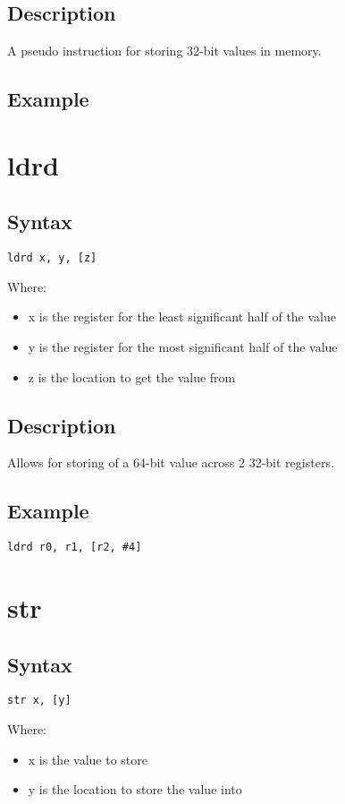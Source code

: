 \documentclass[11pt]{scrartcl}
\begin{document}
\subsection{Description}
A pseudo instruction for storing 32-bit values in memory.
\subsection{Example}

\section{ldrd}
\subsection{Syntax}
\begin{verbatim}
ldrd x, y, [z]
\end{verbatim}
Where:
\begin{itemize}
    \item x is the register for the least significant half of the value
    \item y is the register for the most significant half of the value
    \item z is the location to get the value from
\end{itemize}
\subsection{Description}
Allows for storing of a 64-bit value across 2 32-bit registers.
\subsection{Example}
\begin{verbatim}
ldrd r0, r1, [r2, #4]
\end{verbatim}

\section{str}
\subsection{Syntax}
\begin{verbatim}
str x, [y]
\end{verbatim}
Where:
\begin{itemize}
    \item x is the value to store
    \item y is the location to store the value into
\end{itemize}
\end{document}
